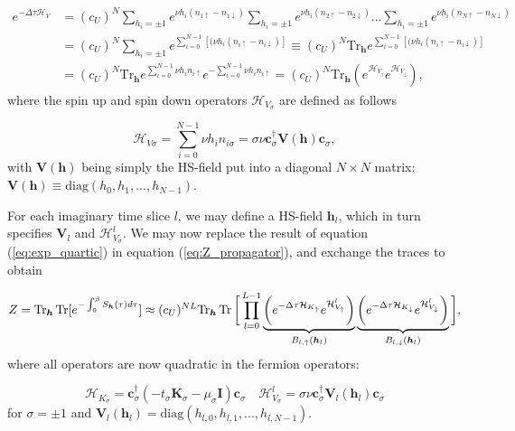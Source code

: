 \begin{equation}\label{eq:exp_quartic}
\begin{split}
e^{-\Delta\tau \mathcal{H}_V} &=  (c_U)^N \sum_{h_i = \pm 1} e^{\nu h_i ( n_{1\uparrow} - n_{1\downarrow} )} \sum_{h_i = \pm 1} e^{\nu h_i ( n_{2\uparrow} - n_{2\downarrow} )} ... \sum_{h_i = \pm 1} e^{\nu h_i ( n_{N\uparrow} - n_{N\downarrow} )} \\
&= (c_U)^N \sum_{h_i = \pm 1} e^{\sum_{i=0}^{N-1} [(\nu h_i ( n_{i\uparrow} - n_{i\downarrow} ) ]} \equiv (c_U)^N \text{Tr}_{\bm h} e^{\sum_{i=0}^{N-1} [(\nu h_i ( n_{i\uparrow} - n_{i\downarrow} ) ]} \\
&= (c_U)^N \text{Tr}_{\bm h} e^{\sum_{i=0}^{N-1} \nu h_i n_{i\uparrow}} e^{-\sum_{i=0}^{N-1} \nu h_i n_{i\uparrow}} = (c_U)^N \text{Tr}_{\bm h} ( e^{\mathcal{H}_{V_\uparrow}} e^{\mathcal{H}_{V_\downarrow}} ) ,
\end{split}
\end{equation}
where the spin up and spin down operators $\mathcal{H}_{V_\sigma}$ are defined as follows

\begin{equation}
\mathcal{H}_{V\sigma} = \sum_{i=0}^{N-1} \nu h_i n_{i\sigma} = \sigma \nu \bm c_\sigma^\dagger \bm V(\bm h) \bm c_\sigma,
\end{equation}
with $\bm V(\bm h)$ being simply the HS-field put into a diagonal $N\times N$ matrix: $\bm V(\bm h) \equiv \text{diag}(h_0, h_1, ..., h_{N-1})$.

For each imaginary time slice $l$, we may define a HS-field $\bm h_l$, which in turn specifies $\bm V_l$ and $\mathcal{H}_{V_\sigma}^l$.
We may now replace the result of equation (\ref{eq:exp_quartic}) in equation (\ref{eq:Z_propagator}), and exchange the traces to obtain

\begin{equation}\label{eq:Z_quadratic}
Z  = \operatorname{Tr}_{\bm h} \operatorname{Tr} [ e^{-\int_0^\beta S_{\bm h}(\tau) d\tau } ] \approx (c_U)^{NL} \text{Tr}_{\bm h} \operatorname{Tr} \bigg[ \prod_{l=0}^{L-1} \underbrace{\bigg( e^{-\Delta\tau  \mathcal{H}_{K_\uparrow}} e^{\mathcal{H}_{V_\uparrow}^l} \bigg)}_{B_{l, \uparrow}(\bm h_l)} \underbrace{\bigg( e^{-\Delta\tau  \mathcal{H}_{K_\downarrow}} e^{\mathcal{H}_{V_\downarrow}^l} \bigg)}_{B_{l, \downarrow}(\bm h_l)} \bigg] ,
\end{equation}
where all operators are now quadratic in the fermion operators:

\begin{equation}
\mathcal{H}_{K_\sigma} = \bm c_\sigma^\dagger ( - t_\sigma \bm K_\sigma -\mu_\sigma \bm I ) \bm c_\sigma \quad \mathcal{H}_{V_\sigma}^l = \sigma \nu \bm c_\sigma^\dagger \bm V_l (\bm h_l) \bm c_\sigma
\end{equation}
for $\sigma = \pm 1$ and $\bm V_l ( \bm h_l ) = \text{diag} ( h_{l, 0} , h_{l, 1}, ... , h_{l, N-1} )$.

